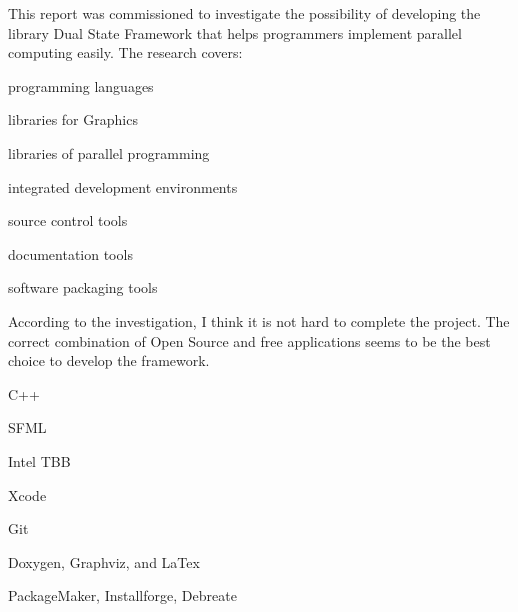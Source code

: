 This report was commissioned to investigate the possibility of developing the library Dual State Framework that helps programmers implement parallel computing easily. The research covers\+:
\begin{DoxyItemize}
\item programming languages
\item libraries for Graphics
\item libraries of parallel programming
\item integrated development environments
\item source control tools
\item documentation tools
\item software packaging tools
\end{DoxyItemize}

According to the investigation, I think it is not hard to complete the project. The correct combination of Open Source and free applications seems to be the best choice to develop the framework.
\begin{DoxyItemize}
\item C++
\item S\+F\+M\+L
\item Intel T\+B\+B
\item Xcode
\item Git
\item Doxygen, Graphviz, and La\+Tex
\item Package\+Maker, Installforge, Debreate 
\end{DoxyItemize}